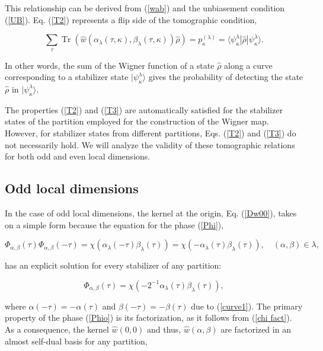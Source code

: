 \documentclass[quantumrep,article,submit,pdftex,moreauthors]{Definitions/mdpi}
\DeclareMathOperator{\Tr}{Tr}
\begin{document}
This relationship can be derived from (\ref{wab}) and the unbiasement condition
(\ref{UB}). Eq. (\ref{T2}) represents a flip side of the tomographic condition,

\begin{equation}
  \sum_{\tau} \Tr\left(
    \hat{w}\left(
      \alpha_{\lambda}(\tau,\kappa),\beta_{\lambda}(\tau,\kappa)
    \right) \hat{\rho}
  \right)
  = p_{\kappa}^{(\lambda)}
  = \langle \psi_{\kappa}^{\lambda} |\hat{\rho}|\psi_{\kappa}^{\lambda}\rangle.
  \label{T3}
\end{equation}

In other words, the sum of the Wigner function of a state $\hat{\rho}$ along a
curve corresponding to a stabilizer state $|\psi_{\kappa}^{\lambda}\rangle$
gives the probability of detecting the state $\hat{\rho}$ in
$|\psi_{\kappa}^{\lambda}\rangle$.

The properties (\ref{T2}) and (\ref{T3}) are automatically satisfied for the
stabilizer states of the partition employed for the construction of the Wigner
map. However, for stabilizer states from different partitions, Eqs. (\ref{T2})
and (\ref{T3}) do not necessarily hold. We will analyze the validity of these
tomographic relations for both odd and even local dimensions.

\subsection{Odd local dimensions}

In the case of odd local dimensions, the kernel at the origin, Eq. (\ref{Dw00}),
takes on a simple form because the equation for the phase (\ref{Phi}), 

\begin{equation*}
  \Phi_{\alpha,\beta}(\tau) \Phi_{\alpha,\beta}(-\tau)
  = \chi\left(\alpha_{\lambda}(-\tau)\beta_{\lambda}(\tau)\right)
  = \chi\left(-\alpha_{\lambda}(\tau)\beta_{\lambda}(\tau)\right),
  \quad (\alpha,\beta) \in \lambda,
\end{equation*}

has an explicit solution for every stabilizer of any partition:

\begin{equation}
  \Phi_{\alpha,\beta }(\tau)
  = \chi\left( -2^{-1}\alpha_{\lambda}(\tau)\beta_{\lambda}(\tau)\right),
  \label{Phio}
\end{equation}

where $\alpha(-\tau)=-\alpha(\tau)$ and $\beta(-\tau)=-\beta(\tau)$ due to
(\ref{curve1}). The primary property of the phase (\ref{Phio}) is its
factorization, as it follows from (\ref{chi fact}). As a consequence, the kernel
$\hat{w}\left(0,0\right)$ and thus, $\hat{w}\left(\alpha,\beta\right)$ are
factorized in an almost self-dual basis for any partition,
\end{document}
